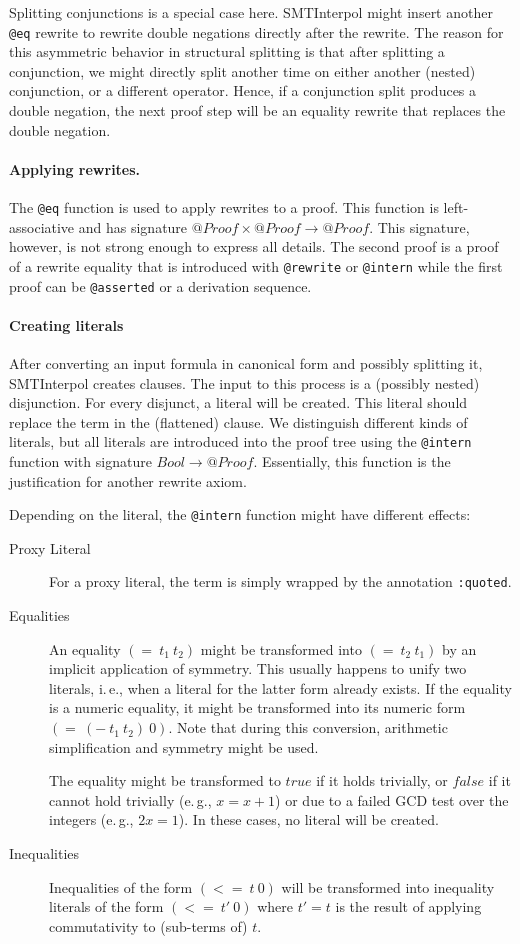 \documentclass[a4paper]{article}
\newcommand\si{SMTInterpol\xspace}
\begin{document}
Splitting conjunctions is a special case here.  \si might insert another
\verb+@eq+ rewrite to rewrite double negations directly after the rewrite.
The reason for this asymmetric behavior in structural splitting is that after
splitting a conjunction, we might directly split another time on either
another (nested) conjunction, or a different operator.  Hence, if a
conjunction split produces a double negation, the next proof step will be an
equality rewrite that replaces the double negation.

\paragraph{Applying rewrites.}  The \verb+@eq+ function is used to apply
rewrites to a proof.  This function is left-associative and has signature
$@Proof\times@Proof\rightarrow @Proof$.  This signature, however, is not
strong enough to express all details.  The second proof is a proof of a
rewrite equality that is introduced with \verb+@rewrite+ or \verb+@intern+
while the first proof can be \verb+@asserted+ or a derivation sequence.

\paragraph{Creating literals}  After converting an input formula in canonical
form and possibly splitting it, \si creates clauses.  The input to this
process is a (possibly nested) disjunction.  For every disjunct, a literal
will be created.  This literal should replace the term in the (flattened)
clause.  We distinguish different kinds of literals, but all literals are
introduced into the proof tree using the \verb+@intern+ function with
signature $Bool\rightarrow @Proof$.  Essentially, this function is the
justification for another rewrite axiom.

Depending on the literal, the \verb+@intern+ function might have different
effects:
\begin{description}
\item[Proxy Literal] For a proxy literal, the term is simply wrapped by the
  annotation \verb+:quoted+.
\item[Equalities] An equality $(=\ t_1\ t_2)$ might be transformed into
  $(=\ t_2\ t_1)$ by an implicit application of symmetry.  This usually
  happens to unify two literals, i.\,e., when a literal for the latter form
  already exists.  If the equality is a numeric equality, it might be
  transformed into its numeric form $(=\ (-\ t_1\ t_2)\ 0)$.  Note that during
  this conversion, arithmetic simplification and symmetry might be used.

  The equality might be transformed to $true$ if it holds trivially, or
  $false$ if it cannot hold trivially (e.\,g., $x=x+1$) or due to a failed GCD
  test over the integers (e.\,g., $2x=1$).  In these cases, no literal will be
  created.
\item[Inequalities] Inequalities of the form $(<=\ t\ 0)$ will be transformed
  into inequality literals of the form $(<=\ t'\ 0)$ where $t'=t$ is the
  result of applying commutativity to (sub-terms of) $t$.
\end{description}
\end{document}
